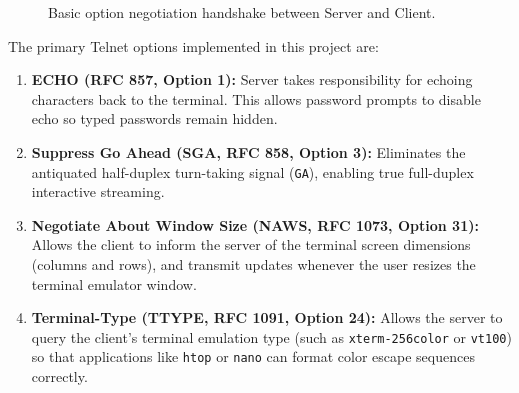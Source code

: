 \begin{figure}[htbp]
\centering
{}
\caption{Basic option negotiation handshake between Server and Client.}
\label{fig:option_handshake}
\end{figure}

The primary Telnet options implemented in this project are:
\begin{enumerate}[leftmargin=2em]
    \item \textbf{ECHO (RFC 857, Option 1):} Server takes responsibility for echoing characters back to the terminal. This allows password prompts to disable echo so typed passwords remain hidden.
    \item \textbf{Suppress Go Ahead (SGA, RFC 858, Option 3):} Eliminates the antiquated half-duplex turn-taking signal (\texttt{GA}), enabling true full-duplex interactive streaming.
    \item \textbf{Negotiate About Window Size (NAWS, RFC 1073, Option 31):} Allows the client to inform the server of the terminal screen dimensions (columns and rows), and transmit updates whenever the user resizes the terminal emulator window.
    \item \textbf{Terminal-Type (TTYPE, RFC 1091, Option 24):} Allows the server to query the client's terminal emulation type (such as \texttt{xterm-256color} or \texttt{vt100}) so that applications like \texttt{htop} or \texttt{nano} can format color escape sequences correctly.
\end{enumerate}

